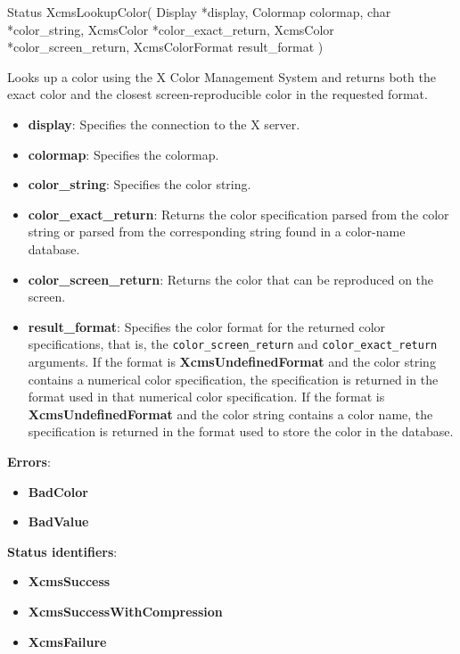\documentclass{report}
\begin{document}
\begin{itemize}
            \begin{cppcode}
                Status XcmsLookupColor(
                    Display *display,
                    Colormap colormap,
                    char *color_string,
                    XcmsColor *color_exact_return,
                    XcmsColor *color_screen_return,
                    XcmsColorFormat result_format
                )
            \end{cppcode}
            \bigbreak \noindent
            Looks up a color using the X Color Management System and returns both the exact color and the closest screen-reproducible color in the requested format.
            \begin{itemize}
                \item \textbf{display}: Specifies the connection to the X server.
                \item \textbf{colormap}: Specifies the colormap.
                \item \textbf{color\_string}: Specifies the color string.
                \item \textbf{color\_exact\_return}: Returns the color specification parsed from the color string or parsed from the corresponding string found in a color-name database.
                \item \textbf{color\_screen\_return}: Returns the color that can be reproduced on the screen.
                \item \textbf{result\_format}: Specifies the color format for the returned color specifications, that is, the \texttt{color\_screen\_return} and \texttt{color\_exact\_return} arguments. If the format is \textbf{XcmsUndefinedFormat} and the color string contains a numerical color specification, the specification is returned in the format used in that numerical color specification. If the format is \textbf{XcmsUndefinedFormat} and the color string contains a color name, the specification is returned in the format used to store the color in the database.
            \end{itemize}
            \bigbreak \noindent
            \textbf{Errors}:
            \begin{itemize}
                \item \textbf{BadColor}
                \item \textbf{BadValue}
            \end{itemize}
            \bigbreak \noindent
            \textbf{Status identifiers}:
            \begin{itemize}
                \item \textbf{XcmsSuccess}
                \item \textbf{XcmsSuccessWithCompression}
                \item \textbf{XcmsFailure}
            \end{itemize}


\end{itemize}
\end{document}
